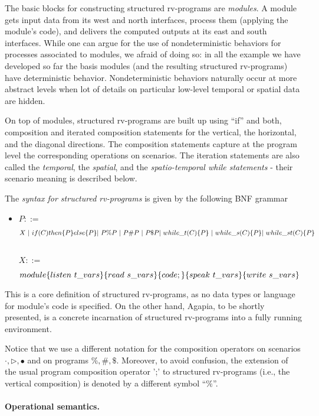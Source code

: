 \documentclass[runningheads]{llncs}
\newcommand{\1}{\u{a}}
\newcommand{\2}{\c{s}}
\newcommand{\5}{\c{t}}
\newcommand{\8}{\^{\i}}
\newcommand{\9}{\^{a}}
\newcommand{\comp}{\cdot}
\newcommand{\svsp}{\vspace{1ex}}
\newcommand{\bi}{\begin{itemize}}
\newcommand{\ei}{\end{itemize}}
\newcommand{\vcomp}{\comp}
\newcommand{\hcomp}{\triangleright}
\newcommand{\dcomp}{\bullet}\newcommand{\dstar}{^\bullet}
\newcommand{\pvcomp}{\%}\newcommand{\phcomp}{\#}\newcommand{\pdcomp}{\$}
\begin{document}
The basic blocks for constructing structured rv-programs are {\em modules}. A module gets input data from its
west and north interfaces, process them (applying the module's code), and delivers the computed outputs at its
east and south interfaces. While one can argue for the use of nondeterministic behaviors for processes
associated to modules, we afraid of doing so: in all the example we have developed so far the basis modules
(and the resulting structured rv-programs) have deterministic behavior. Nondeterministic behaviors naturally
occur at more abstract levels when lot of details on particular low-level temporal or spatial data are hidden.

On top of modules, structured rv-programs are built up using ``if'' and both, composition and iterated
composition statements for the vertical, the horizontal, and the diagonal directions. The composition
statements capture at the program level the corresponding operations on scenarios. The iteration statements
are also called the {\em temporal}, the {\em spatial}, and the {\em spatio-temporal while statements} - their
scenario meaning is described below.

The {\em syntax for structured rv-programs} is given by the following BNF grammar\bi\item[] $P::=
{}$\parbox[t]{8cm}{$X\ |\ if(C)then\{P\}else\{P\} |\ P\pvcomp P\ |\ P\phcomp P\ |\ P\pdcomp
  P\\ |\ while\_t(C)\{P\}\ |\ while\_s(C)\{P\} |\ while\_st(C)\{P\}$}\svsp\\ $X::=
{}$\parbox[t]{8cm}{$module\{listen\ t\_vars\}\{read\ s\_vars\}\\\{code;\}\{speak\ t\_vars\}\{write\ s\_vars\}$}\ei
This is a core definition of structured rv-programs, as no data types or language for module's code is
specified. On the other hand, Agapia, to be shortly presented, is a concrete incarnation of structured
rv-programs into a fully running environment.

Notice that we use a different notation for the composition operators on scenarios $\vcomp,\hcomp,\dcomp$ and
on programs $\pvcomp,\phcomp,\pdcomp$. Moreover, to avoid confusion, the extension of the usual program
composition operator ';' to structured rv-programs (i.e., the vertical composition) is denoted by a different
symbol ``$\pvcomp$''.

\paragraph{Operational semantics.}
\end{document}
